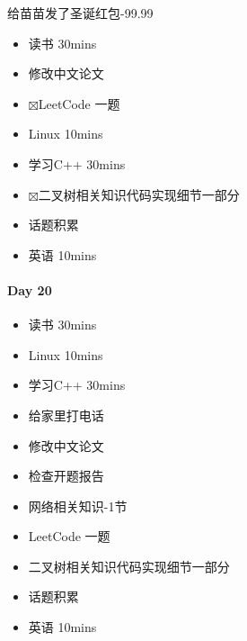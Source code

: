 \documentclass[UTF8,a4paper,8pt]{ctexbook}
\begin{document}
		 	 给苗苗发了圣诞红包-99.99
		 	 \begin{itemize}
		 	 	\item  \makebox[0pt][l]{$\square$}\raisebox{.15ex}{\hspace{0.1em}$\checkmark$}读书  30mins	
		 	 	\item  \makebox[0pt][l]{$\square$}\raisebox{.15ex}{\hspace{0.1em}$\checkmark$}修改中文论文
		 	 	
		 	 	\item  $\boxtimes$LeetCode 一题
		 	 	\item  \makebox[0pt][l]{$\square$}\raisebox{.15ex}{\hspace{0.1em}$\checkmark$}Linux 10mins	  
		 	 	\item  \makebox[0pt][l]{$\square$}\raisebox{.15ex}{\hspace{0.1em}$\checkmark$}学习C++ 30mins 		 	 	
		 	 	\item  $\boxtimes$二叉树相关知识代码实现细节一部分		
		 	 	
		 	 	\item  \makebox[0pt][l]{$\square$}\raisebox{.15ex}{\hspace{0.1em}$\checkmark$}话题积累 	
		 	 	\item  英语 10mins 	 
		 	 \end{itemize}
 	 \paragraph{Day 20      \quad     }
		 	 \begin{itemize}
		 	 	\item  \makebox[0pt][l]{$\square$}\raisebox{.15ex}{\hspace{0.1em}$\checkmark$}读书  30mins	
		 	 	\item  \makebox[0pt][l]{$\square$}\raisebox{.15ex}{\hspace{0.1em}$\checkmark$}Linux 10mins	  
		 	 	\item  学习C++ 30mins 
		 	 	\item  给家里打电话
		 	 	\item  修改中文论文
		 	 	\item  \makebox[0pt][l]{$\square$}\raisebox{.15ex}{\hspace{0.1em}$\checkmark$}检查开题报告
		 	 	
		 	 	\item  网络相关知识-1节
		 	 	\item  LeetCode 一题
		 	 	\item  二叉树相关知识代码实现细节一部分
		 	 	
		 	 	\item  话题积累 	
		 	 	\item  英语 10mins 	 
		 	 \end{itemize}
\end{document}
